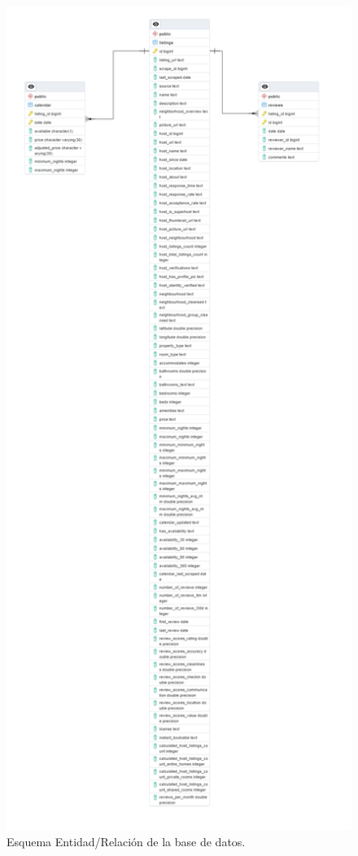 \begin{figure}[h]
    \centering
    \includegraphics[scale=0.24]{capturas/Schema.png}
    \caption{Esquema Entidad/Relación de la base de datos.}
    \label{fig:esquema-bd}
\end{figure}


